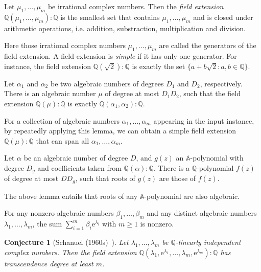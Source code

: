 \documentclass[a4paper,UKenglish,cleveref,autoref,thm-restate,authorcolumns]{lipics-v2019}
\newtheorem{conjecture}[theorem]{Conjecture}
\begin{document}
\begin{definition}
Let $\mu_1,\ldots,\mu_m$ be irrational complex numbers.
Then the \emph{field extension} $\mathbb{Q}(\mu_1,\ldots,\mu_m):\mathbb{Q}$
is the smallest set
that contains $\mu_1,\ldots,\mu_m$ and is closed under arithmetic operations,
i.e. addition, substraction, multiplication and division.
\end{definition}
Here those irrational complex numbers $\mu_1,\ldots,\mu_m$ are called
the generators of the field extension.
A field extension is \emph{simple} if it has only one generator.
For instance, the field extension $\mathbb{Q}(\sqrt{2}):\mathbb{Q}$
is exactly the set $\{a+b\sqrt{2} : a,b \in \mathbb{Q}\}$.

\begin{lemma}\label{lem:simple}
	Let $\alpha_1$ and $\alpha_2$ be two algebraic numbers of
	degrees $D_1$ and $D_2$, respectively.
	There is an algebraic number $\mu$ of degree at most $D_1 D_2$,
	such that the field extension $\mathbb{Q}(\mu):\mathbb{Q}$
	is exactly $\mathbb{Q}(\alpha_1,\alpha_2):\mathbb{Q}$.
\end{lemma}
For a collection of algebraic numbers $\alpha_1,\ldots,\alpha_m$
appearing in the input instance,
by repeatedly applying this lemma,
we can obtain a simple field extension $\mathbb{Q}(\mu):\mathbb{Q}$
that can span all $\alpha_1,\ldots,\alpha_m$.
\begin{lemma}\label{lem:closed}
	Let $\alpha$ be an algebraic number of degree $D$,
	and $g(z)$ an $\mathbb{A}$-polynomial with degree $D_g$
	and coefficients taken from $\mathbb{Q}(\alpha):\mathbb{Q}$.
	There is a $\mathbb{Q}$-polynomial $f(z)$ of degree at most $DD_g$,
	such that roots of $g(z)$ are those of $f(z)$.
\end{lemma}
The above lemma entails that
roots of any $\mathbb{A}$-polynomial are also algebraic.

\begin{theorem}\label{Lindemann}
	For any nonzero algebraic numbers $\beta_1,\ldots,\beta_m$ and
	any distinct algebraic numbers $\lambda_1,\ldots,\lambda_m$,
	the sum $\sum_{i=1}^m \beta_i \mathrm{e}^{\lambda_i}$ with $m \ge 1$ is nonzero.
\end{theorem}

\begin{conjecture}[Schanuel (1960s)~\cite{Ax71}]\label{Schanuel}
	Let $\lambda_1,\ldots,\lambda_m$ be
	$\mathbb{Q}$-linearly independent complex numbers.
	Then the field extension
	$\mathbb{Q}(\lambda_1,\mathrm{e}^{\lambda_1},\ldots,\lambda_m,\mathrm{e}^{\lambda_m}):\mathbb{Q}$
	has transcendence degree at least $m$.
\end{conjecture}
\end{document}
